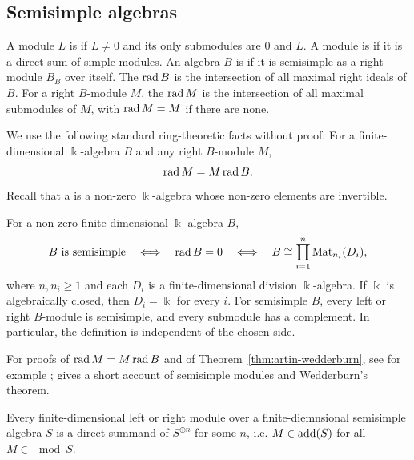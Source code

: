 \subsection{Semisimple algebras}

\begin{definition}\label{def:semisimple}
A module $L$ is  if $L\neq 0$ and its only submodules are $0$ and $L$.
A module is  if it is a direct sum of simple modules.
An algebra $B$ is  if it is semisimple as a right module $B_B$ over itself.
The  $\operatorname{rad}\nolimits B$ is the intersection of all maximal right ideals of $B$.
For a right $B$-module $M$, the  $\operatorname{rad}\nolimits M$ is the intersection of all maximal submodules of $M$, with $\operatorname{rad}\nolimits M=M$ if there are none.
\end{definition}

We use the following standard ring-theoretic facts without proof.
For a finite-dimensional $\Bbbk$-algebra $B$ and any right $B$-module $M$,
\[
\operatorname{rad}\nolimits M=M\operatorname{rad}\nolimits B.
\]
Recall that a  is a non-zero $\Bbbk$-algebra whose non-zero elements are invertible.

\begin{theorem}\label{thm:artin-wedderburn}
For a non-zero finite-dimensional $\Bbbk$-algebra $B$,
\[
B\text{ is semisimple}
\quad\Longleftrightarrow\quad
\operatorname{rad}\nolimits B=0
\quad\Longleftrightarrow\quad
B\cong\prod_{i=1}^n\operatorname{Mat}\nolimits_{n_i}(D_i),
\]
where $n,n_i\geq 1$ and each $D_i$ is a finite-dimensional division $\Bbbk$-algebra.
If $\Bbbk$ is algebraically closed, then $D_i=\Bbbk$ for every $i$.
For semisimple $B$, every left or right $B$-module is semisimple, and every submodule has a complement. In particular, the definition is independent of the chosen side.
\end{theorem}

\begin{advanced}
For proofs of $\operatorname{rad}\nolimits M=M\operatorname{rad}\nolimits B$ and of Theorem~\ref{thm:artin-wedderburn}, see for example \cite{DK94}; \cite{Bez23} gives a short account of semisimple modules and Wedderburn's theorem.
\end{advanced}

\begin{corollary}\label{cor:semisimple-summands}
Every finite-dimensional left or right module over a finite-diemnsional semisimple algebra $S$ is a direct summand of $S^{\oplus n}$ for some $n$, i.e. $M\in \operatorname{add}(S)$ for all $M\in \mod S$.
\end{corollary}

